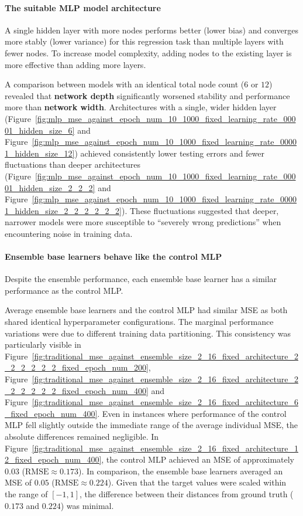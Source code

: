 \paragraph{The suitable MLP model architecture}
A single hidden layer with more nodes performs better (lower bias) and converges more stably (lower variance) for this regression task than multiple layers with fewer nodes. To increase model complexity, adding nodes to the existing layer is more effective than adding more layers. 

A comparison between models with an identical total node count ($6$ or $12$) revealed that \textbf{network depth} significantly worsened stability and performance more than \textbf{network width}. Architectures with a single, wider hidden layer (Figure~\ref{fig:mlp_mse_against_epoch_num_10_1000_fixed_learning_rate_00001_hidden_size_6} and Figure~\ref{fig:mlp_mse_against_epoch_num_10_1000_fixed_learning_rate_00001_hidden_size_12}) achieved consistently lower testing errors and fewer fluctuations than deeper architectures (Figure~\ref{fig:mlp_mse_against_epoch_num_10_1000_fixed_learning_rate_00001_hidden_size_2_2_2} and Figure~\ref{fig:mlp_mse_against_epoch_num_10_1000_fixed_learning_rate_00001_hidden_size_2_2_2_2_2_2}). These fluctuations suggested that deeper, narrower models were more susceptible to ``severely wrong predictions'' when encountering noise in training data. 

\paragraph{Ensemble base learners behave like the control MLP}
Despite the ensemble performance, each ensemble base learner has a similar performance as the control MLP. 

Average ensemble base learners and the control MLP had similar MSE as both shared identical hyperparameter configurations. The marginal performance variations were due to different training data partitioning. This consistency was particularly visible in Figure~\ref{fig:traditional_mse_against_ensemble_size_2_16_fixed_architecture_2_2_2_2_2_2_fixed_epoch_num_200}, Figure~\ref{fig:traditional_mse_against_ensemble_size_2_16_fixed_architecture_2_2_2_2_2_2_fixed_epoch_num_400} and Figure~\ref{fig:traditional_mse_against_ensemble_size_2_16_fixed_architecture_6_fixed_epoch_num_400}. Even in instances where performance of the control MLP fell slightly outside the immediate range of the average individual MSE, the absolute differences remained negligible. In Figure~\ref{fig:traditional_mse_against_ensemble_size_2_16_fixed_architecture_12_fixed_epoch_num_400}, the control MLP achieved an MSE of approximately $0.03$ ($\text{RMSE} \approx 0.173$). In comparison, the ensemble base learners averaged an MSE of $0.05$ ($\text{RMSE} \approx 0.224$). Given that the target values were scaled within the range of $[-1, 1]$, the difference between their distances from ground truth ($0.173$ and $0.224$) was minimal. 

